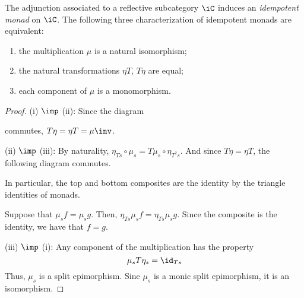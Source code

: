 \documentclass{amsart}
\begin{document}
\begin{lem}
  The adjunction associated to a reflective subcategory $\iC$ induces an \emph{idempotent monad} on $\iC$.
  The following three characterization of idempotent monads are equivalent:
  \begin{enumerate}
  \item the multiplication $\mu$ is a natural isomorphism;
  \item the natural transformations $\eta T$, $T\eta$ are equal;
  \item each component of $\mu$ is a monomorphism.
  \end{enumerate}
\end{lem}
\begin{proof}
  (i) $\imp$ (ii): Since the diagram
  
  commutes, $T\eta = \eta T = \mu\inv$.

  (ii) $\imp$ (iii): By naturality, $\eta_{Ts} \circ \mu_{s} = T\mu_{s} \circ \eta_{T^{2}s}$.
  And since $T\eta = \eta T$, the following diagram commutes.
  
  In particular, the top and bottom composites are the identity by the triangle identities of monads.

  Suppose that $\mu_{s}f = \mu_{s}g$.
  Then, $\eta_{Ts}\mu_{s}f = \eta_{Ts}\mu_{s}g$.
  Since the composite is the identity, we have that $f = g$.

  (iii) $\imp$ (i): Any component of the multiplication has the property
  \[
    \mu_{s}T\eta_{s} = \id_{Ts}
  \]
  Thus, $\mu_{s}$ is a split epimorphism.
  Sine $\mu_{s}$ is a monic split epimorphism, it is an isomorphism.
\end{proof}



\end{document}
